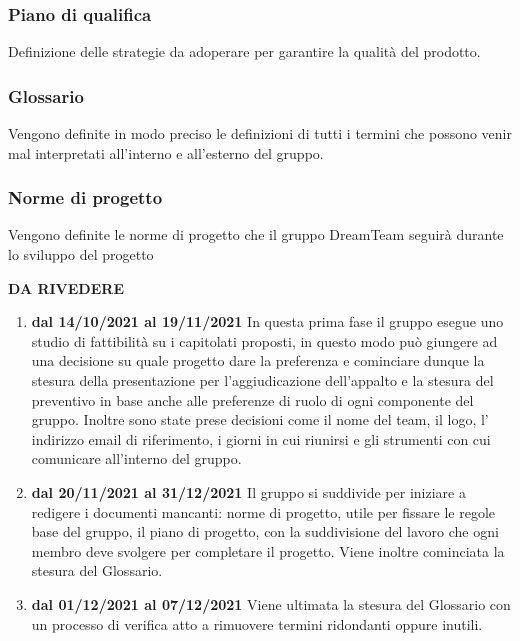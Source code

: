 \subsubsection{Piano di qualifica}
Definizione delle strategie da adoperare per garantire la qualità del prodotto.
\subsubsection{Glossario}
Vengono definite in modo preciso le definizioni di tutti i termini che possono venir mal interpretati all'interno e all’esterno del gruppo.
\subsubsection{Norme di progetto}
Vengono definite le norme di progetto che il gruppo DreamTeam seguirà durante lo sviluppo del progetto

\textbf{DA RIVEDERE}
\begin{enumerate}
\item \textbf{dal 14/10/2021 al 19/11/2021} In questa prima fase il gruppo esegue uno studio di fattibilità su i capitolati proposti, in questo modo può giungere ad una decisione su quale progetto dare la preferenza e cominciare dunque la stesura della presentazione per l’aggiudicazione dell’appalto e la stesura del preventivo in base anche alle preferenze di ruolo di ogni componente del gruppo. Inoltre sono state prese decisioni come il nome del team, il logo, l’ indirizzo email di riferimento, i giorni in cui riunirsi e gli strumenti con cui comunicare all’interno del gruppo.

\item \textbf{dal 20/11/2021 al 31/12/2021} Il gruppo si suddivide per iniziare a redigere i documenti mancanti: norme di progetto, utile per fissare le regole base del gruppo, il piano di progetto, con la suddivisione del lavoro che ogni membro deve svolgere per completare il progetto. Viene inoltre cominciata la stesura del Glossario.

\item \textbf{dal 01/12/2021 al 07/12/2021} Viene ultimata la stesura del Glossario con un processo di verifica atto a rimuovere termini ridondanti oppure inutili.

\end{enumerate}
